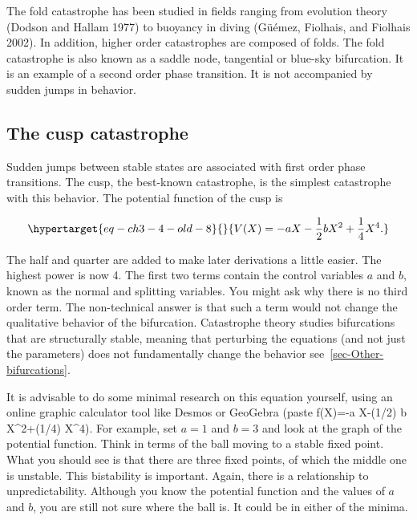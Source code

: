 \documentclass[
  a4paper,
  DIV=11,
  numbers=noendperiod]{scrreprt}
\begin{document}
The fold catastrophe has been studied in fields ranging from evolution
theory (Dodson and Hallam 1977) to buoyancy in diving (Güémez, Fiolhais,
and Fiolhais 2002). In addition, higher order catastrophes are composed
of folds. The fold catastrophe is also known as a saddle node,
tangential or blue-sky bifurcation. It is an example of a second order
phase transition. It is not accompanied by sudden jumps in behavior.

\hypertarget{sec-The-cusp-catastrophe}{%
\subsection{The cusp catastrophe}\label{sec-The-cusp-catastrophe}}

Sudden jumps between stable states are associated with first order phase
transitions. The cusp, the best-known catastrophe, is the simplest
catastrophe with this behavior. The potential function of the cusp is

\begin{equation}\protect\hypertarget{eq-ch3-4-old-8}{}{ V(X) = - aX - \frac{1}{2}bX^{2} + \frac{1}{4}X^{4}. }\label{eq-ch3-4-old-8}\end{equation}

The half and quarter are added to make later derivations a little
easier. The highest power is now 4. The first two terms contain the
control variables \(a\) and \(b\), known as the normal and splitting
variables. You might ask why there is no third order term. The
non-technical answer is that such a term would not change the
qualitative behavior of the bifurcation. Catastrophe theory studies
bifurcations that are structurally stable, meaning that perturbing the
equations (and not just the parameters) does not fundamentally change
the behavior see~\ref{sec-Other-bifurcations}.

It is advisable to do some minimal research on this equation yourself,
using an online graphic calculator tool like Desmos or GeoGebra (paste
f(X)=-a X-(1/2) b X\^{}2+(1/4) X\^{}4). For example, set \(a = 1\) and
\(b = 3\) and look at the graph of the potential function. Think in
terms of the ball moving to a stable fixed point. What you should see is
that there are three fixed points, of which the middle one is unstable.
This bistability is important. Again, there is a relationship to
unpredictability. Although you know the potential function and the
values of \(a\) and \(b\), you are still not sure where the ball is. It
could be in either of the minima.
\end{document}
